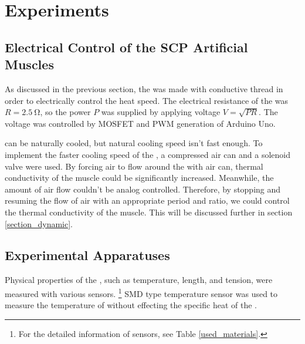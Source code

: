 
\section{Experiments}\label{section_experiments}



\subsection{Electrical Control of the SCP Artificial Muscles}\label{section_electrical_control}
As discussed in the previous section, the \scp was made with conductive thread in order to electrically control the heat speed. The electrical resistance of the \scp was $R=\SI{2.5}{\ohm}$, so the power $P$ was supplied by applying voltage $V=\sqrt{PR}$. The voltage was controlled by MOSFET and PWM generation of Arduino Uno.

\scp can be naturally cooled, but natural cooling speed isn't fast enough.
To implement the faster cooling speed of the \scpnospace, a compressed air can and a solenoid valve were used. 
By forcing air to flow around the \scp with air can, thermal conductivity of the muscle could be significantly increased.
Meanwhile, the amount of air flow couldn't be analog controlled. Therefore, by stopping and resuming the flow of air with an appropriate period and ratio, we could control the thermal conductivity of the muscle. This will be discussed further in section \ref{section_dynamic}.


\subsection{Experimental Apparatuses} \label{section_appa}

Physical properties of the \scpsnospace, such as temperature, length, and tension, were measured with various sensors.
\footnote{For the detailed information of sensors, see Table \ref{used_materials}.}
SMD type temperature sensor was used to measure the temperature of \scps without effecting the specific heat of the \scpnospace.

